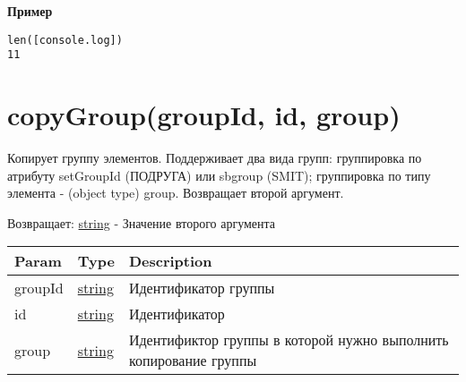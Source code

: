 \textbf{Пример}

\begin{verbatim}
len([console.log])
11
\end{verbatim}

\hypertarget{copygroupgroupid-id-group-string}{%
\section{copyGroup(groupId, id, group)}\label{copygroupgroupid-id-group-string}}

Копирует группу элементов. Поддерживает два вида групп: группировка по
атрибуту setGroupId (ПОДРУГА) или sbgroup (SMIT); группировка по типу
элемента - (object type) group. Возвращает второй аргумент.

Возвращает: \protect\hyperlink{string}{string} - Значение второго
аргумента

\begin{longtable}[]{@{}lll@{}}
\toprule
\begin{minipage}[b]{0.30\columnwidth}\raggedright
Param\strut
\end{minipage} & \begin{minipage}[b]{0.30\columnwidth}\raggedright
Type\strut
\end{minipage} & \begin{minipage}[b]{0.30\columnwidth}\raggedright
Description\strut
\end{minipage}\tabularnewline
\midrule
\endhead
\begin{minipage}[t]{0.30\columnwidth}\raggedright
groupId\strut
\end{minipage} & \begin{minipage}[t]{0.30\columnwidth}\raggedright
\protect\hyperlink{string}{string}\strut
\end{minipage} & \begin{minipage}[t]{0.30\columnwidth}\raggedright
Идентификатор группы\strut
\end{minipage}\tabularnewline
\begin{minipage}[t]{0.30\columnwidth}\raggedright
id\strut
\end{minipage} & \begin{minipage}[t]{0.30\columnwidth}\raggedright
\protect\hyperlink{string}{string}\strut
\end{minipage} & \begin{minipage}[t]{0.30\columnwidth}\raggedright
Идентификатор\strut
\end{minipage}\tabularnewline
\begin{minipage}[t]{0.30\columnwidth}\raggedright
group\strut
\end{minipage} & \begin{minipage}[t]{0.30\columnwidth}\raggedright
\protect\hyperlink{string}{string}\strut
\end{minipage} & \begin{minipage}[t]{0.30\columnwidth}\raggedright
Идентификтор группы в которой нужно выполнить копирование группы\strut
\end{minipage}\tabularnewline
\bottomrule
\end{longtable}

